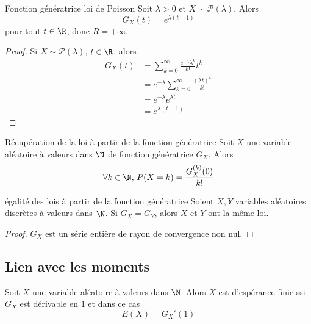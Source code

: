\begin{proposition}{Fonction génératrice loi de Poisson}{}
    Soit $\lambda > 0$ et $X \sim \mathcal P(\lambda)$. Alors 
    $$ G_X(t) = e^{\lambda (t - 1)} $$
    pour tout $t \in \R$, donc $R = + \infty$.
\end{proposition}

\begin{proof}
    Si $X \sim \mathcal P(\lambda)$, $t \in \R$, alors
    \begin{align}
        G_X(t) & = \sum_{k = 0}^{\infty} \frac{e^{- \lambda} \lambda^k}{k!} t^k \\
        & = e^{- \lambda} \sum_{k = 0}^{\infty} \frac{(\lambda t)^k}{k!} \\
        & = e^{- \lambda} e^{\lambda t} \\
        & = e^{\lambda (t - 1)}
    \end{align}
\end{proof}

\begin{theoreme}{Récupération de la loi à partir de la fonction génératrice}{}
    Soit $X$ une variable aléatoire à valeurs dans $\N$ de fonction génératrice $G_X$.
    Alors $$\forall k \in \N, \, P(X = k) = \frac{G_X^{(k)}(0)}{k!}$$
\end{theoreme}

\begin{corollaire}{égalité des lois à partir de la fonction génératrice}{}
    Soient $X, Y$ variables aléatoires discrètes à valeurs dans $\N$.
    Si $G_X = G_Y$, alors $X$ et $Y$ ont la même loi.
\end{corollaire}

\begin{proof}
    $G_X$ est un série entière de rayon de convergence non nul. 
\end{proof}

\subsection{Lien avec les moments}

\begin{theoreme}{}{}
    Soit $X$ une variable aléatoire à valeurs dans $\N$. Alors $X$ est 
    d'espérance finie ssi $G_X$ est dérivable en $1$ et dans ce cas
    $$ E(X) = G_X'(1) $$
\end{theoreme}

